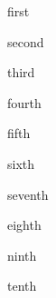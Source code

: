 \documentclass[notebook]{guildcamp4} %
\begin{document}
\startnotebook{\nJoanBooklet{}}

\begin{page}{first}



\end{page}

\begin{page}{second}



\end{page}

\begin{page}{third}



\end{page}

\begin{page}{fourth}



\end{page}

\begin{page}{fifth}



\end{page}

\begin{page}{sixth}



\end{page}

\begin{page}{seventh}



\end{page}

\begin{page}{eighth}



\end{page}

\begin{page}{ninth}



\end{page}

\begin{page}{tenth}



\end{page}

\endnotebook
\end{document}
